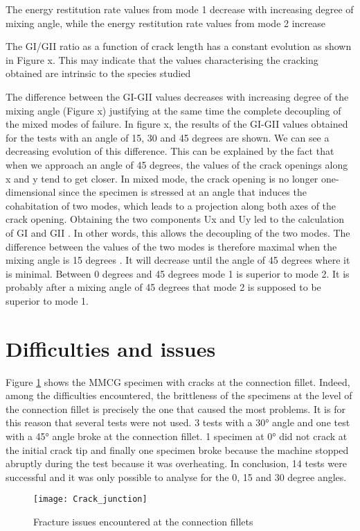 The energy restitution rate values from mode 1 decrease with increasing degree of mixing angle, while the energy restitution rate values from mode 2 increase

The GI/GII ratio as a function of crack length has a constant evolution as shown in Figure x. This may indicate that the values characterising the cracking obtained are intrinsic to the species studied

The difference between the GI-GII values decreases with increasing degree of the mixing angle (Figure x) justifying at the same time the complete decoupling of the mixed modes of failure. In figure x, the results of the GI-GII values obtained for the tests with an angle of 15, 30 and 45 degrees are shown. We can see a decreasing evolution of this difference. This can be explained by the fact that when we approach an angle of 45 degrees, the values of the crack openings along x and y tend to get closer. In mixed mode, the crack opening is no longer one-dimensional since the specimen is stressed at an angle that induces the cohabitation of two modes, which leads to a projection along both axes of the crack opening. Obtaining the two components Ux and Uy led to the calculation of GI and GII . In other words, this allows the decoupling of the two modes. The difference between the values of the two modes is therefore maximal when the mixing angle is 15 degrees . It will decrease until the angle of 45 degrees where it is minimal. Between 0 degrees and 45 degrees mode 1 is superior to mode 2. It is probably after a mixing angle of 45 degrees that mode 2 is supposed to be superior to mode 1.

\section{Difficulties and issues}

Figure \ref{fig:Crack_junction} shows the MMCG specimen with cracks at the connection fillet. Indeed, among the difficulties encountered, the brittleness of the specimens at the level of the connection fillet is precisely the one that caused the most problems. It is for this reason that several tests were not used. 3 tests with a 30° angle and one test with a 45° angle broke at the connection fillet. 1 specimen at 0° did not crack at the initial crack tip and finally one specimen broke because the machine stopped abruptly during the test because it was overheating. In conclusion, 14 tests were successful and it was only possible to analyse for the 0, 15 and 30 degree angles.

\begin{figure}[htp]
	\centering
	\texttt{[image: Crack\_junction]}
	\caption{Fracture issues encountered at the connection fillets}
	\label{fig:Crack_junction}
\end{figure}